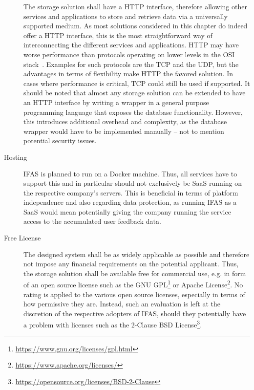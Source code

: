 \begin{description}
The storage solution shall have a \ac{HTTP} interface, therefore allowing other services and applications to store and retrieve data via a universally supported medium.
As most solutions considered in this chapter do indeed offer a \ac{HTTP} interface, this is the most straightforward way of interconnecting the different services and applications.
\ac{HTTP} may have worse performance than protocols operating on lower levels in the \ac{OSI} stack~\cite{zimmermann1980osi}.
Examples for such protocols are the \ac{TCP} and the \ac{UDP}, but the advantages in terms of flexibility make \ac{HTTP} the favored solution.
In cases where performance is critical, TCP could still be used if supported.
It should be noted that almost any storage solution can be extended to have an \ac{HTTP} interface by writing a wrapper in a general purpose programming language that exposes the database functionality.
However, this introduces additional overhead and complexity, as the database wrapper would have to be implemented manually -- not to mention potential security issues.
\item [Hosting]
\ac{IFAS} is planned to run on a Docker machine.
Thus, all services have to support this and in particular should not exclusively be \ac{SaaS} running on the respective company's servers.
This is beneficial in terms of platform independence and also regarding data protection, as running \ac{IFAS} as a \ac{SaaS} would mean potentially giving the company running the service access to the accumulated user feedback data.
\item [Free License]
The designed system shall be as widely applicable as possible and therefore not impose any financial requirements on the potential applicant.
Thus, the storage solution shall be available free for commercial use, e.g. in form of an open source license such as the GNU GPL\footnote{\url{https://www.gnu.org/licenses/gpl.html}} or Apache License\footnote{\url{https://www.apache.org/licenses/}}.
No rating is applied to the various open source licenses, especially in terms of how permissive they are.
Instead, such an evaluation is left at the discretion of the respective adopters of \ac{IFAS}, should they potentially have a problem with licenses such as the 2-Clause BSD License\footnote{\url{https://opensource.org/licenses/BSD-2-Clause}}.
\end{description}


